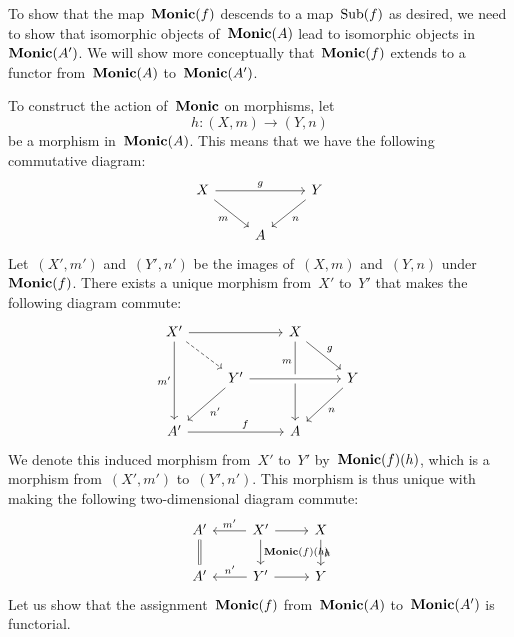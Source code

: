 To show that the map~$\mathbf{Monic}(f)$ descends to a map~$\operatorname{Sub}(f)$ as desired, we need to show that isomorphic objects of~$\mathbf{Monic}(A)$ lead to isomorphic objects in~$\mathbf{Monic}(A')$.
We will show more conceptually that~$\mathbf{Monic}(f)$ extends to a functor from~$\mathbf{Monic}(A)$ to~$\mathbf{Monic}(A')$.

To construct the action of~$\mathbf{Monic}$ on morphisms, let
\[
	h \colon (X, m) \to (Y, n)
\]
be a morphism in~$\mathbf{Monic}(A)$.
This means that we have the following commutative diagram:
\[
	\begin{tikzcd}[column sep = normal]
		X
		\arrow{rr}[above]{g}
		\arrow{dr}[below left]{m}
		&
		{}
		&
		Y
		\arrow{dl}[below right]{n}
		\\
		{}
		&
		A
		&
		{}
	\end{tikzcd}
\]
Let~$(X', m')$ and~$(Y', n')$ be the images of~$(X, m)$ and~$(Y, n)$ under~$\mathbf{Monic}(f)$.
There exists a unique morphism from~$X'$ to~$Y'$ that makes the following diagram commute:
\[
	\begin{tikzcd}
		X'
		\arrow{rr}
		\arrow{dd}[left]{m'}
		\arrow[dashed]{dr}
		&
		{}
		&
		X
		\arrow{dd}[left, near start]{m}
		\arrow{dr}[above right]{g}
		&
		{}
		\\
		{}
		&
		Y'
		\arrow[crossing over]{rr}
		\arrow{dl}[below right]{n'}
		&
		{}
		&
		Y
		\arrow{dl}[below right]{n}
		\\[0.5em]
		A'
		\arrow{rr}[above, pos = 0.6]{f}
		&
		{}
		&
		A
		&
		{}
	\end{tikzcd}
\]
We denote this induced morphism from~$X'$ to~$Y'$ by~$\mathbf{Monic}(f)(h)$, which is a morphism from~$(X', m')$ to~$(Y', n')$.
This morphism is thus unique with making the following two-dimensional diagram commute:
\[
	\begin{tikzcd}
		A'
		\arrow[equal]{d}
		&
		X'
		\arrow{l}[above]{m'}
		\arrow{d}[right]{\Monic(f)(h)}
		\arrow{r}
		&
		X
		\arrow{d}[right]{h}
		\\
		A'
		&
		Y'
		\arrow{l}[above]{n'}
		\arrow{r}
		&
		Y
	\end{tikzcd}
\]
Let us show that the assignment~$\mathbf{Monic}(f)$ from~$\mathbf{Monic}(A)$ to~$\mathbf{Monic}(A')$ is functorial.
